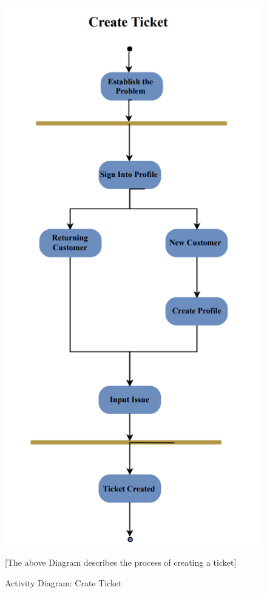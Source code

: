 \documentclass[letterpaper]{article}
\begin{document}
\begin{figure}[htbp]
  \includegraphics[]{AD_CreateTicket}
  \caption{Activity Diagram: Crate Ticket}[The above Diagram describes the process of creating a ticket]
  \centering
\end{figure}
\end{document}

